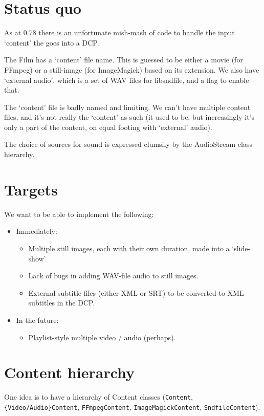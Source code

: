 \documentclass{article}
\begin{document}
\section{Status quo}

As at 0.78 there is an unfortunate mish-mash of code to handle the
input `content' the goes into a DCP.

The Film has a `content' file name.  This is guessed to be either a
movie (for FFmpeg) or a still-image (for ImageMagick) based on its
extension.  We also have `external audio', which is a set of WAV files
for libsndfile, and a flag to enable that.

The `content' file is badly named and limiting.  We can't have
multiple content files, and it's not really the `content' as such (it
used to be, but increasingly it's only a part of the content, on equal
footing with `external' audio).

The choice of sources for sound is expressed clumsily by the
AudioStream class hierarchy.


\section{Targets}

We want to be able to implement the following:

\begin{itemize}
\item Immediately:
\begin{itemize}
\item Multiple still images, each with their own duration, made into a `slide-show'
\item Lack of bugs in adding WAV-file audio to still images.
\item External subtitle files (either XML or SRT) to be converted to XML subtitles in the DCP.
\end{itemize}

\item In the future:
\begin{itemize}
\item Playlist-style multiple video / audio (perhaps).
\end{itemize}
\end{itemize}


\section{Content hierarchy}

One idea is to have a hierarchy of Content classes (\texttt{Content},
\texttt{\{Video/Audio\}Content}, \texttt{FFmpegContent}, \texttt{ImageMagickContent},
\texttt{SndfileContent}).
\end{document}
